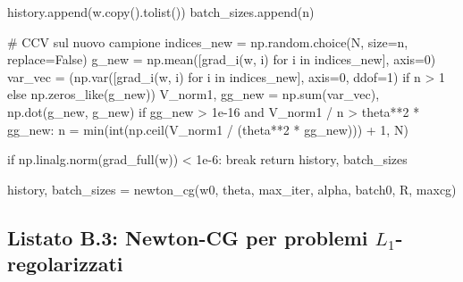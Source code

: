 \begin{pythoncode}[title= Newton-CG]
        history.append(w.copy().tolist())
        batch_sizes.append(n)

        # CCV sul nuovo campione
        indices_new = np.random.choice(N, size=n, replace=False)
        g_new = np.mean([grad_i(w, i) for i in indices_new], axis=0)
        var_vec = (np.var([grad_i(w, i) for i in indices_new], axis=0, ddof=1)
                   if n > 1 else np.zeros_like(g_new))
        V_norm1, gg_new = np.sum(var_vec), np.dot(g_new, g_new)
        if gg_new > 1e-16 and V_norm1 / n > theta**2 * gg_new:
            n = min(int(np.ceil(V_norm1 / (theta**2 * gg_new))) + 1, N)

        if np.linalg.norm(grad_full(w)) < 1e-6:
            break
    return history, batch_sizes

history, batch_sizes = newton_cg(w0, theta, max_iter, alpha, batch0, R, maxcg)
\end{pythoncode}



\subsection{Listato B.3: Newton-CG per problemi $L_1$-regolarizzati}

